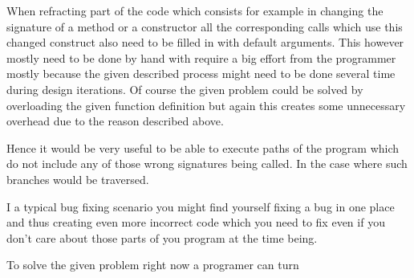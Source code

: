 When refracting part of the code which consists for example in changing the
signature of a method or a constructor all the corresponding calls which use
this changed construct also need to be filled in with default arguments. This
however mostly need to be done by hand with require a big effort from the
programmer mostly because the given described process might need to be done
several time during design iterations. Of course the given problem could be
solved by overloading the given function definition but again this creates some
unnecessary overhead due to the reason described above.

Hence it would be very useful to be able to execute paths of the program which
do not include any of those wrong signatures being called. In the case where
such branches would be traversed.

I a typical bug fixing scenario you might find yourself fixing a bug in one
place and thus creating even more incorrect code which you need to fix even if
you don't care about those parts of you program at the time being.

To solve the given problem right now a programer can turn